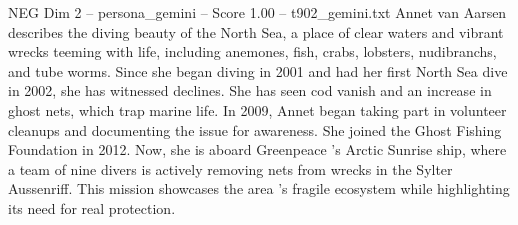 \begin{textsample}{NEG Dim 2 – persona\_gemini – Score 1.00 – t902\_gemini.txt}  \label{ex:f2_neg_007}
Annet van Aarsen describes the diving beauty of the North Sea, a place of clear waters and vibrant wrecks teeming with life, including anemones, fish, crabs, lobsters, nudibranchs, and tube worms.
Since she began diving in 2001 and had her first North Sea dive in 2002, she has witnessed declines.
She has seen cod vanish and an increase in ghost nets, which trap marine life.
In 2009, Annet began taking part in volunteer cleanups and documenting the issue for awareness.
She joined the Ghost Fishing Foundation in 2012.
Now, she is aboard Greenpeace 's Arctic Sunrise ship, where a team of nine divers is actively removing nets from wrecks in the Sylter Aussenriff.
This mission showcases the area 's fragile ecosystem while highlighting its need for real protection.

\end{textsample}
